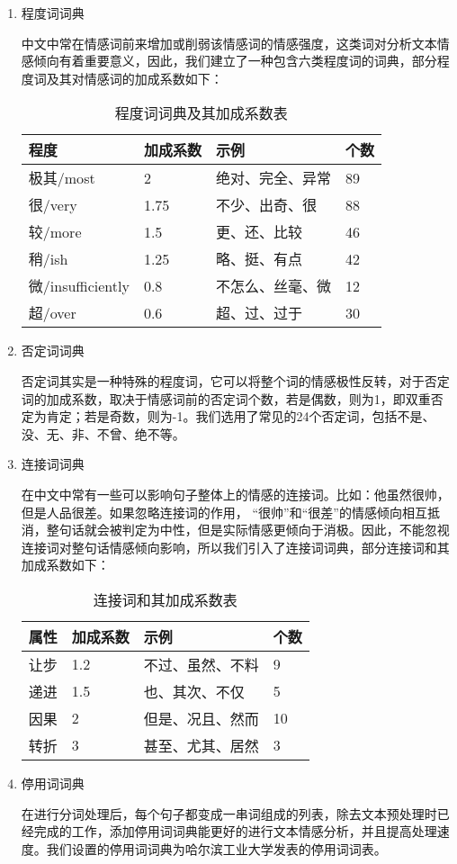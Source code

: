 \begin{enumerate}[(1)]
\item 程度词词典

中文中常在情感词前来增加或削弱该情感词的情感强度，这类词对分析文本情感倾向有着重要意义，因此，我们建立了一种包含六类程度词的词典，部分程度词及其对情感词的加成系数如下：
\begin{table}[htbp]
\begin{center}
\caption{程度词词典及其加成系数表}
\label{tab:chengduci}
\begin{tabularx}{\linewidth}{ZZZZ}\toprule
程度 & 加成系数 & 示例 & 个数 \\\midrule
极其/most & 2 & 绝对、完全、异常 & 89\\
很/very & 1.75 & 不少、出奇、很 & 88\\
较/more & 1.5 & 更、还、比较 & 46\\
稍/ish & 1.25 & 略、挺、有点 & 42\\
微/insufficiently & 0.8 & 不怎么、丝毫、微 & 12\\
超/over & 0.6 & 超、过、过于 & 30\\\bottomrule
\end{tabularx}
\end{center}
\end{table}

\item 否定词词典

否定词其实是一种特殊的程度词，它可以将整个词的情感极性反转，对于否定词的加成系数，取决于情感词前的否定词个数，若是偶数，则为1，即双重否定为肯定；若是奇数，则为-1。我们选用了常见的24个否定词，包括不是、没、无、非、不曾、绝不等。

\item 连接词词典

在中文中常有一些可以影响句子整体上的情感的连接词。比如：他虽然很帅，但是人品很差。如果忽略连接词的作用，	``很帅''和``很差''的情感倾向相互抵消，整句话就会被判定为中性，但是实际情感更倾向于消极。因此，不能忽视连接词对整句话情感倾向影响，所以我们引入了连接词词典，部分连接词和其加成系数如下：
\begin{table}[htbp]
\caption{连接词和其加成系数表}
\label{tab:lianjieci}
\begin{tabularx}{\linewidth}{ZZZZ}\toprule
属性 & 加成系数 & 示例 & 个数 \\\midrule
让步 & 1.2 & 不过、虽然、不料 & 9\\
递进 & 1.5 & 也、其次、不仅 & 5\\
因果 & 2 & 但是、况且、然而 & 10\\
转折 & 3 & 甚至、尤其、居然 & 3\\\bottomrule
\end{tabularx}
\end{table}

\item 停用词词典

在进行分词处理后，每个句子都变成一串词组成的列表，除去文本预处理时已经完成的工作，添加停用词词典能更好的进行文本情感分析，并且提高处理速度。我们设置的停用词词典为哈尔滨工业大学发表的停用词词表。

\end{enumerate}

